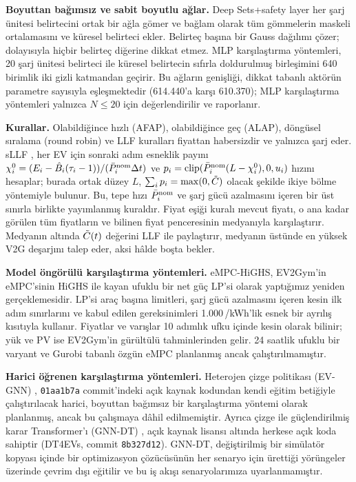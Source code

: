 \textbf{Boyuttan bağımsız ve sabit boyutlu ağlar.}
Deep Sets+safety layer her şarj ünitesi belirtecini ortak bir ağla gömer ve bağlam olarak tüm gömmelerin maskeli ortalamasını ve küresel belirteci ekler.
Belirteç başına bir Gauss dağılımı çözer; dolayısıyla hiçbir belirteç diğerine dikkat etmez.
MLP karşılaştırma yöntemleri, 20 şarj ünitesi belirteci ile küresel belirtecin sıfırla doldurulmuş birleşimini 640 birimlik iki gizli katmandan geçirir.
Bu ağların genişliği, dikkat tabanlı aktörün parametre sayısıyla eşleşmektedir (614.440'a karşı 610.370); MLP karşılaştırma yöntemleri yalnızca $N\le20$ için değerlendirilir ve raporlanır.


\textbf{Kurallar.}
Olabildiğince hızlı (AFAP), olabildiğince geç (ALAP), döngüsel sıralama (round robin) ve LLF kuralları fiyattan habersizdir ve yalnızca şarj eder.
sLLF \cite{chen2022smoothed}, her EV için sonraki adım esneklik payını $\chi_i^0=(E_i-\hat B_i(\tau_i-1))/(\bar P^{\mathrm{nom}}_i\Delta t)$ ve $p_i=\operatorname{clip}(\bar P^{\mathrm{nom}}_i(L-\chi_i^0),0,u_i)$ hızını hesaplar; burada ortak düzey $L$, $\sum_ip_i=\max(0,\tilde C)$ olacak şekilde ikiye bölme yöntemiyle bulunur.
Bu, tepe hızı $\bar P^{\mathrm{nom}}_i$ ve şarj gücü azalmasını içeren bir üst sınırla birlikte yayımlanmış kuraldır.
Fiyat eşiği kuralı mevcut fiyatı, o ana kadar görülen tüm fiyatların ve bilinen fiyat penceresinin medyanıyla karşılaştırır.
Medyanın altında $\tilde C(t)$ değerini LLF ile paylaştırır, medyanın üstünde en yüksek V2G deşarjını talep eder, aksi hâlde boşta bekler.

\textbf{Model öngörülü karşılaştırma yöntemleri.}
eMPC-HiGHS, EV2Gym'in eMPC'sinin \cite{diazlondono2026open} HiGHS ile kayan ufuklu bir net güç LP'si olarak yaptığımız yeniden gerçeklemesidir.
LP'si araç başına limitleri, şarj gücü azalmasını içeren kesin ilk adım sınırlarını ve kabul edilen gereksinimleri 1.000\,\texteuro/kWh'lik esnek bir ayrılış kısıtıyla kullanır.
Fiyatlar ve varışlar 10 adımlık ufku içinde kesin olarak bilinir; yük ve PV ise EV2Gym'in gürültülü tahminlerinden gelir.
24 saatlik ufuklu bir varyant ve Gurobi tabanlı özgün eMPC planlanmış ancak çalıştırılmamıştır.

\textbf{Harici öğrenen karşılaştırma yöntemleri.}
Heterojen çizge politikası (EV-GNN) \cite{orfanoudakis2025scalable}, \texttt{01aa1b7a} commit'indeki açık kaynak kodundan kendi eğitim betiğiyle çalıştırılacak harici, boyuttan bağımsız bir karşılaştırma yöntemi olarak planlanmış, ancak bu çalışmaya dâhil edilmemiştir.
Ayrıca çizge ile güçlendirilmiş karar Transformer'ı (GNN-DT) \cite{orfanoudakis2026graph}, açık kaynak lisansı altında herkese açık koda sahiptir (DT4EVs, commit \texttt{8b327d12}).
GNN-DT, değiştirilmiş bir simülatör kopyası içinde bir optimizasyon çözücüsünün her senaryo için ürettiği yörüngeler üzerinde çevrim dışı eğitilir ve bu iş akışı senaryolarımıza uyarlanmamıştır.


